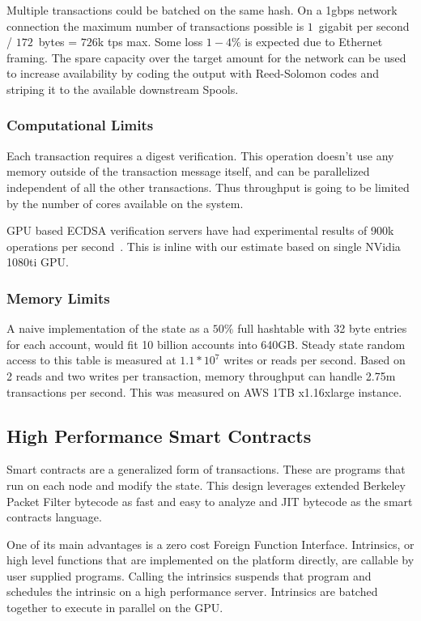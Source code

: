 \documentclass[12pt]{article}
\begin{document}
Multiple transactions could be batched on the same hash. On a 1gbps network connection the maximum number of transactions possible is $1$~gigabit per second / $172$~bytes = $726$k tps max. Some loss $1-4\%$ is expected due to Ethernet framing. The spare capacity over the target amount for the network can be used to increase availability by coding the output with Reed-Solomon codes and striping it to the available downstream Spools.
\subsubsection{Computational Limits}
Each transaction requires a digest verification. This operation doesn’t use any memory outside of the transaction message itself, and can be parallelized independent of all the other transactions. Thus throughput is going to be limited by the number of cores available on the system.

GPU based ECDSA verification servers have had experimental results of 900k operations per second~\cite{gpuecc}. This is inline with our estimate based on single NVidia 1080ti GPU. 
\subsubsection{Memory Limits}
A naive implementation of the state as a \(50\%\) full hashtable with 32 byte entries for each account, would fit 10 billion accounts into 640GB. Steady state random access to this table is measured at \(1.1 * 10^7\) writes or reads per second. Based on 2 reads and two writes per transaction, memory throughput can handle 2.75m transactions per second. This was measured on AWS 1TB x1.16xlarge instance.

\subsection{High Performance Smart Contracts}\label{sec:smartcontracts}

Smart contracts are a generalized form of transactions. These are programs that run on each node and modify the state. This design leverages extended Berkeley Packet Filter bytecode as fast and easy to analyze and JIT bytecode as the smart contracts language.

One of its main advantages is a zero cost Foreign Function Interface. Intrinsics, or high level functions that are implemented on the platform directly, are callable by user supplied programs. Calling the intrinsics suspends that program and schedules the intrinsic on a high performance server. Intrinsics are batched together to execute in parallel on the GPU.
\end{document}
